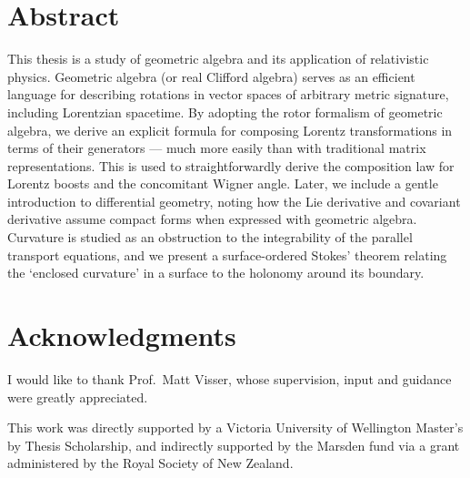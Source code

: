 \chapter*{Abstract}

This thesis is a study of geometric algebra and its application of relativistic physics.
Geometric algebra (or real Clifford algebra) serves as an efficient language for describing rotations in vector spaces of arbitrary metric signature, including Lorentzian spacetime.
By adopting the rotor formalism of geometric algebra, we derive an explicit  formula for composing Lorentz transformations in terms of their generators --- much more easily than with traditional matrix representations.
This is used to straightforwardly derive the composition law for Lorentz boosts and the concomitant Wigner angle.
Later, we include a gentle introduction to differential geometry, noting how the Lie derivative and covariant derivative assume compact forms when expressed with geometric algebra.
Curvature is studied as an obstruction to the integrability of the parallel transport equations, and we present a surface-ordered Stokes' theorem relating the `enclosed curvature' in a surface to the holonomy around its boundary.

\chapter*{Acknowledgments}

I would like to thank Prof.\ Matt Visser, whose supervision, input and guidance were greatly appreciated.

This work was directly supported by a Victoria University of Wellington Master's by Thesis Scholarship, and indirectly supported by the Marsden fund via a grant administered by the Royal Society of New Zealand.